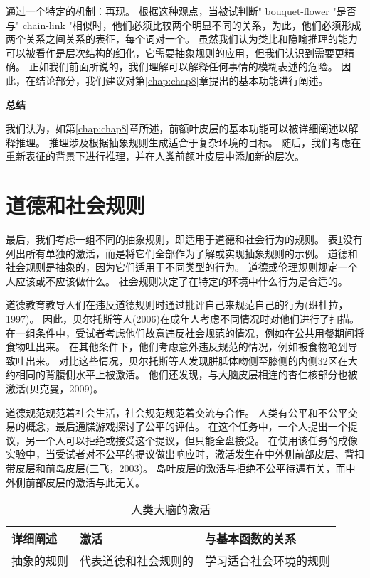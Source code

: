 通过一个特定的机制：再现。
根据这种观点，当被试判断" bouquet-flower "是否与" chain-link "相似时，他们必须比较两个明显不同的关系，为此，他们必须形成两个关系之间关系的表征，每个词对一个。
虽然我们认为类比和隐喻推理的能力可以被看作是层次结构的细化，它需要抽象规则的应用，但我们认识到需要更精确。
正如我们前面所说的，我们理解可以解释任何事情的模糊表述的危险。
因此，在结论部分，我们建议对第\ref{chap:chap8}章提出的基本功能进行阐述。



\textbf{总结}

我们认为，如第\ref{chap:chap8}章所述，前额叶皮层的基本功能可以被详细阐述以解释推理。
推理涉及根据抽象规则生成适合于复杂环境的目标。
随后，我们考虑在重新表征的背景下进行推理，并在人类前额叶皮层中添加新的层次。



\section{道德和社会规则}

最后，我们考虑一组不同的抽象规则，即适用于道德和社会行为的规则。
表\ref{tab:9_9}没有列出所有单独的激活，而是将它们全部作为了解或实现抽象规则的示例。
道德和社会规则是抽象的，因为它们适用于不同类型的行为。
道德或伦理规则规定一个人应该或不应该做什么。
社会规则决定了在特定的环境中什么行为是合适的。


道德教育教导人们在违反道德规则时通过批评自己来规范自己的行为(班杜拉，1997)。
因此，贝尔托斯等人(2006)在成年人考虑不同情况时对他们进行了扫描。
在一组条件中，受试者考虑他们故意违反社会规范的情况，例如在公共用餐期间将食物吐出来。
在其他条件下，他们考虑意外违反规范的情况，例如被食物呛到导致吐出来。
对比这些情况，贝尔托斯等人发现胼胝体吻侧至膝侧的内侧32区在大约相同的背腹侧水平上被激活。
他们还发现，与大脑皮层相连的杏仁核部分也被激活(贝克曼，2009)。


道德规范规范着社会生活，社会规范规范着交流与合作。
人类有公平和不公平交易的概念，最后通牒游戏探讨了公平的评估。
在这个任务中，一个人提出一个提议，另一个人可以拒绝或接受这个提议，但只能全盘接受。
在使用该任务的成像实验中，当受试者对不公平的提议做出响应时，激活发生在中外侧前部皮层、背扣带皮层和前岛皮层(三飞，2003)。
岛叶皮层的激活与拒绝不公平待遇有关，而中外侧前部皮层的激活与此无关。


\begin{table}[htbp] 
	\newcommand{\tabincell}[2]{\begin{tabular}{@{}#1@{}}#2\end{tabular}} %
	\centering
	\caption{人类大脑的激活\label{tab:9_9}}
	\renewcommand\arraystretch{1.5}	%
	\begin{tabular}{lll}
		\toprule
		详细阐述 & 激活 & 与基本函数的关系\\
		\midrule
		抽象的规则 & 代表道德和社会规则的 & 学习适合社会环境的规则  \\
		
		\bottomrule
		
	\end{tabular}%
\end{table}%


